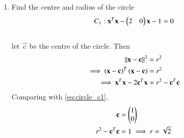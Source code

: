 \renewcommand{\theequation}{\theenumi}
\begin{enumerate}[label=\arabic*.,ref=\thesubsection.\theenumi]
\item Find the centre and radius of the circle
\begin{equation}
C_1: \mathbf{x}^T\mathbf{x} - \begin{pmatrix}2 & 0\end{pmatrix}\mathbf{x} 
-1 = 0 
\label{eq:circle_c1}
\end{equation}
%
\\
\solution let $\vec{c}$ be the centre of the circle.  Then
\begin{align}
\left\lVert\mathbf{x}-\mathbf{c}\right\rVert^2 &= r^2
\\
\implies \left(\mathbf{x}-\mathbf{c}\right)^T\left(\mathbf{x}-\mathbf{c}\right) &= r^2
\\
\implies \mathbf{x}^T\mathbf{x} - 2\mathbf{c}^T\mathbf{x} &= r^2-\mathbf{c}^T\mathbf{c}
\end{align}
%
Comparing with \eqref{eq:circle_c1},
\begin{align}
\mathbf{c} &= \begin{pmatrix}1 \\0\end{pmatrix}
\\
r^2-\mathbf{c}^T\mathbf{c} &= 1 \implies r = \sqrt{2}
\end{align}


\end{enumerate}
